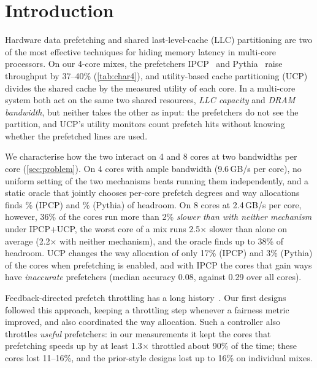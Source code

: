 \section{Introduction}
\label{sec:intro}

Hardware data prefetching and shared last-level-cache (LLC) partitioning are two of the most effective techniques
for hiding memory latency in multi-core processors.  On our 4-core mixes, the prefetchers IPCP~\cite{pakalapati2020ipcp} and Pythia~\cite{bera2021pythia} raise
throughput by 37--40\% (\cref{tab:char4}), and utility-based cache partitioning (UCP)~\cite{qureshi2006ucp} divides
the shared cache by the measured utility of each core.
In a multi-core system both act on the same two shared resources, \emph{LLC capacity} and \emph{DRAM
bandwidth}, but neither takes the other as input: the prefetchers do not see the partition, and UCP's utility
monitors count prefetch hits without knowing whether the prefetched lines are used.

We characterise how the two interact on 4 and 8 cores at two bandwidths per core (\cref{sec:problem}).  On 4 cores with
ample bandwidth (9.6\,GB/s per core), no uniform setting of the two
mechanisms beats running them independently, and a static oracle that jointly chooses per-core prefetch degrees and way allocations finds
\OrcIpMean\% (IPCP) and \OrcPyMean\% (Pythia) of headroom.  On 8 cores at 2.4\,GB/s per core, however,
36\% of the cores run more than 2\% \emph{slower than with neither mechanism} under IPCP+UCP, the worst core of a mix
runs 2.5$\times$ slower than alone on average (2.2$\times$ with neither mechanism), and the oracle finds up to 38\% of headroom.  UCP changes the way allocation of only 17\% (IPCP) and 3\%
(Pythia) of the cores when prefetching is enabled, and with IPCP the cores that gain ways have \emph{inaccurate}
prefetchers (median accuracy 0.08, against 0.29 over all cores).

Feedback-directed prefetch throttling has a long history~\cite{srinath2007fdp,ebrahimi2009hpac,ebrahimi2011prefetchaware}.
Our first designs followed this approach, keeping a throttling step whenever a fairness metric improved, and also
coordinated the way allocation.  Such a controller also throttles \emph{useful} prefetchers: in our measurements it
kept the cores that prefetching speeds up by at least 1.3$\times$ throttled about 90\% of the time; these
cores lost 11--16\%, and the prior-style designs lost up to 16\% on individual mixes.

